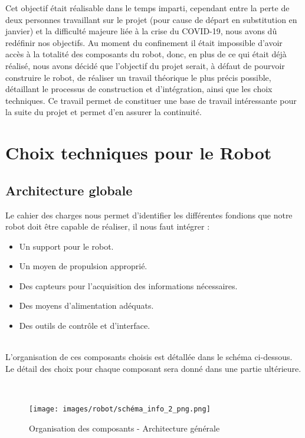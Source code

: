 \documentclass[french]{rapportENSTAB}
\begin{document}
Cet objectif était réalisable dans le temps imparti, cependant entre la perte de deux personnes travaillant sur le projet (pour cause de départ en substitution en janvier) et la  difficulté majeure liée à la crise du COVID-19, nous avons dû redéfinir nos objectifs. Au moment du confinement il était impossible d'avoir accès à la totalité des composants du robot, donc, en plus de ce qui était déjà réalisé, nous avons décidé que l'objectif du projet serait, à défaut de pourvoir construire le robot, de réaliser un travail théorique le plus précis possible, détaillant le processus de construction et d'intégration, ainsi que les choix techniques. Ce travail permet de constituer une base de travail intéressante pour la suite du projet et permet d'en assurer la continuité.

\section{Choix techniques pour le Robot}
\subsection{Architecture globale}

Le cahier des charges nous permet d'identifier les différentes fondions que notre robot doit être capable de réaliser, il nous faut intégrer : 
 \begin{itemize}[label=\textbullet, font=\small\color{blue}]
    \item Un support pour le robot.
    \item Un moyen de propulsion approprié.
    \item Des capteurs pour l'acquisition des informations nécessaires.
    \item Des moyens d'alimentation adéquats.
    \item Des outils de contrôle et d'interface.
\end{itemize}   \\ 

L'organisation de ces composants choisis  est détallée dans le schéma ci-dessous. Le détail des choix pour chaque composant sera donné dans une partie ultérieure.

 \\
 
 \begin{figure}[H]
    \centering
    \texttt{[image: images/robot/schéma\_info\_2\_png.png]}
    \caption{Organisation des composants - Architecture générale}
    \label{fig:cdcf}
\end{figure}
\end{document}

